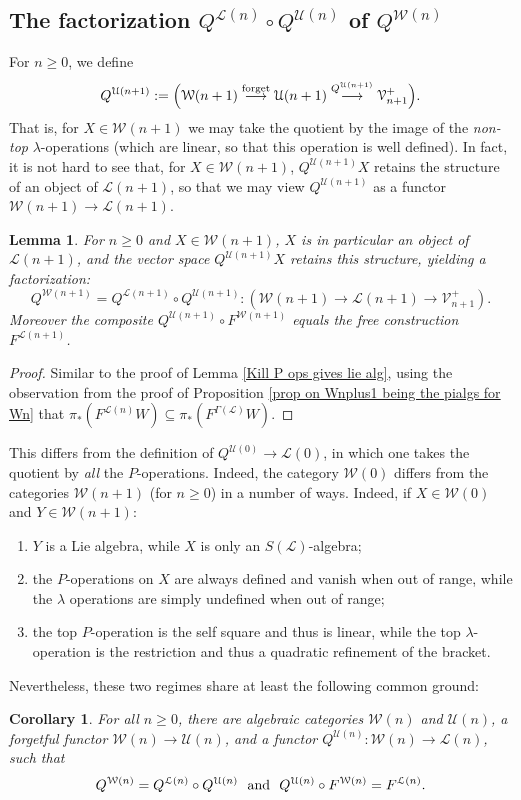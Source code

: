 \documentclass[11pt]{amsart} \renewcommand{\baselinestretch}{1.2}
\theoremstyle{plain}
\newtheorem{lem}[thm]{Lemma}
\newtheorem{cor}[thm]{Corollary}
\theoremstyle{definition}
\renewcommand{\to}{\longrightarrow}
\newcommand{\scrL}{\mathscr{L}}
\newcommand{\calU}{\mathcal{U}}
\newcommand{\calL}{\mathcal{L}}
\newcommand{\calV}{\mathcal{V}}
\newcommand{\calw}{\mathcal{W}}
\newcommand{\LieOperad}{{\scrL}}
\newcommand{\vect}[2]{\calV^{#1}_{#2}}
\begin{document}
\begin{homotopy operations for PRLs}
\subsection{The factorization $Q^{\calL(n)}\circ Q^{\calU(n)}$ of $Q^{\calw(n)}$}
For $n\geq0$, we define
\[Q^{\calU(n+1)}:=\Bigl(\calw(n+1)\overset{\textup{forget}}{\to}\calU(n+1)\overset{Q^{\calU(n+1)}}{\to}\vect{+}{n+1}\Bigr).\]
That is, for $X\in\calw(n+1)$ we may take the quotient by the image of the \emph{non-top} $\lambda$-operations (which are linear, so that this operation is well defined). In fact, it is not hard to see that, for $X\in\calw(n+1)$, $Q^{\calU(n+1)}X$ retains the structure of an object of $\calL(n+1)$, so that we may view $Q^{\calU(n+1)}$ as a functor $\calw(n+1)\to \calL(n+1)$.
\begin{lem}
\label{Kill lambda ops gives lie alg}
For $n\geq0$ and $X\in\calw(n+1)$, $X$ is in particular an object of $\calL(n+1)$, and the vector space $Q^{\calU(n+1)}X$ retains this structure, yielding a factorization:%
\[Q^{\calw(n+1)}=Q^{\calL(n+1)}\circ Q^{\calU(n+1)}:\left(\calw(n+1)\to \calL(n+1)\to \vect{+}{n+1}\right).\]
Moreover the composite $Q^{\calU(n+1)}\circ F^{\calw(n+1)}$ equals the free construction $F^{\calL(n+1)}$.
\end{lem}
\begin{proof}
Similar to the proof of Lemma \ref{Kill P ops gives lie alg}, using the observation from the proof of Proposition \ref{prop on Wnplus1 being the pialgs for Wn} that $\pi_*(F^{\calL(n)}W)\subseteq\pi_*(F^{\Gamma(\LieOperad)}W)$.
\end{proof}
This differs from the definition of $Q^{\calU(0)}\to \calL(0)$, in which one takes the quotient by \emph{all} the $P$-operations.
Indeed, the category $\calw(0)$ differs from the categories $\calw(n+1)$ (for $n\geq0$) in a number of ways. Indeed, if $X\in\calw(0)$ and $Y\in \calw(n+1) $:
\begin{enumerate}
\item $Y$ is a  Lie algebra, while $X$ is only an $S(\LieOperad)$-algebra;
\item the $P$-operations on $X$ are always defined and vanish when out of range, while the $\lambda$ operations are simply undefined when out of range;
\item the top $P$-operation is the self square and thus is linear, while the top $\lambda$-operation is the restriction and thus a quadratic refinement of the bracket.
\end{enumerate}
Nevertheless, these two regimes share at least the following common ground:
\begin{cor}
\label{indec functors common ground 0 and n}
For all $n\geq0$, there are algebraic categories $\calw(n)$ and $\calU(n)$, a forgetful functor $\calw(n)\to\calU(n)$, and a functor $Q^{\calU(n)}:\calw(n)\to \calL(n)$, such that
\[Q^{\calw(n)}=Q^{\calL(n)}\circ Q^{\calU(n)}\textup{\ \ and\ \ }Q^{\calU(n)}\circ F^{\calw(n)}=F^{\calL(n)}.\]
\end{cor}



\end{homotopy operations for PRLs}
\end{document}
